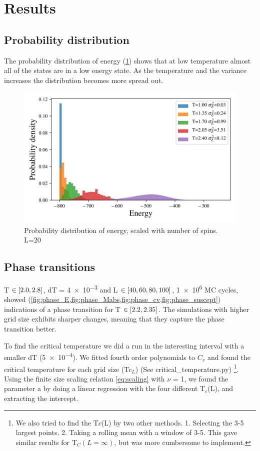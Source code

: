 \section{Results}




\subsection{Probability distribution}

The probability distribution of energy (\cref{fig:distribution}) shows that
at low temperature almost all of the states are in a low energy state.
As the temperature and the variance increases the distribution becomes more
spread out.

\begin{figure}[H]
  \centering
  \includegraphics[width=\textwidth]{../figures/distribution.png}
  \caption{Probability distribution of energy, scaled with number of spins. L=20}
  \label{fig:distribution}
\end{figure}




\subsection{Phase transitions}

T $\in \left[2.0,2.8\right]$, dT = \num{4e-3} and L $\in \left[40,60,80,100\right]$,
\num{1e6} MC cycles,
showed (\cref{fig:phase_E,fig:phase_Mabs,fig:phase_cv,fig:phase_suscept})
indications of a phase transition for T $\in \left[2.2,2.35\right]$. The simulations
with higher grid size exhibits sharper changes, meaning that they capture
the phase transition better.

To find the critical temperature we did a run in the interesting interval with a
smaller dT (\num{5e-4}). We fitted fourth order polynomials to $C_v$ and found
the critical temperature for each grid size (Tc$_{L}$) (See
critical\_temperature.py) \footnote{We also tried to find the T$c$(L) by two
other methods. 1. Selecting the 3-5 largest points. 2. Taking a rolling mean
with a window of 3-5. This gave similar results for T$_C(L=\infty)$, but was
more cumbersome to implement.}. Using the finite size scaling relation
\cref{eq:scaling} with $\nu$ = 1, we found the parameter a by doing a linear
regression with the four different T$_c$(L), and extracting the intercept.


